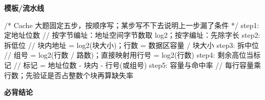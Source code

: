 \documentclass[10pt,a4paper]{ctexart}
\begin{document}
\textbf{模板/流水线}

\begin{codebox}
/* Cache 大题固定五步，按顺序写；某步写不下去说明上一步漏了条件 */
step1: 定地址位数        // 按字节编址：地址空间字节数取 log2；按字编址：先除字长
step2: 拆低位            // 块内地址 = log2(块大小)；行数 = 数据区容量 / 块大小
step3: 拆中位            // 组号 = log2(行数 / 路数)；直接映射用行号 = log2(行数)
step4: 剩余高位当标记    // 标记 = 地址位数 - 块内 - 行号(或组号)
step5: 容量与命中率      // 每行容量乘行数；先验证是否占整数个块再算缺失率
\end{codebox}




\textbf{必背结论}
\end{document}
